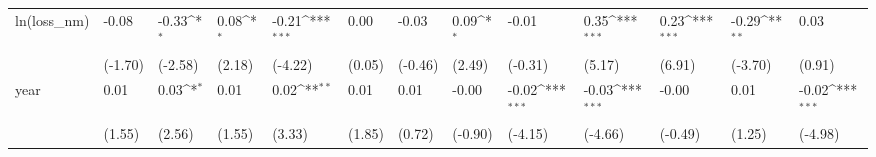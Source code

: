 \def\sym#1{\ifmmode^{#1}\else\(^{#1}\)\fi}
\begin{tabular}{p{1.5cm} p{1.7cm} p{1.7cm} p{1.7cm}  p{1.7cm} p{1.7cm} p{1.7cm} p{1.7cm} p{1.7cm}  p{1.7cm} p{1.7cm} p{1.7cm} p{1.7cm} }
\hline
ln(loss\_nm)     &    -0.08         &    -0.33\sym{*}  &     0.08\sym{*}  &    -0.21\sym{***}&     0.00         &    -0.03         &     0.09\sym{*}  &    -0.01         &     0.35\sym{***}&     0.23\sym{***}&    -0.29\sym{**} &     0.03         \\
                &  (-1.70)         &  (-2.58)         &   (2.18)         &  (-4.22)         &   (0.05)         &  (-0.46)         &   (2.49)         &  (-0.31)         &   (5.17)         &   (6.91)         &  (-3.70)         &   (0.91)         \\
year            &     0.01         &     0.03\sym{*}  &     0.01         &     0.02\sym{**} &     0.01         &     0.01         &    -0.00         &    -0.02\sym{***}&    -0.03\sym{***}&    -0.00         &     0.01         &    -0.02\sym{***}\\
                &   (1.55)         &   (2.56)         &   (1.55)         &   (3.33)         &   (1.85)         &   (0.72)         &  (-0.90)         &  (-4.15)         &  (-4.66)         &  (-0.49)         &   (1.25)         &  (-4.98)         \\
\end{tabular}
